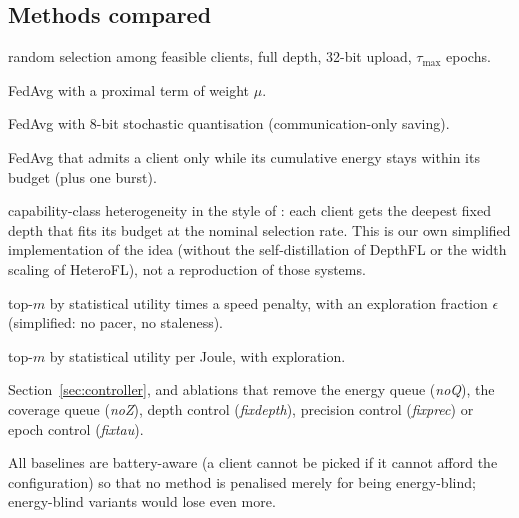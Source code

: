 \subsection{Methods compared}
\begin{description}[leftmargin=1.2em,labelindent=0pt,itemsep=1pt,topsep=2pt]
\item[FedAvg \citep{mcmahan2017communication}] random selection among feasible clients, full depth, 32-bit upload, $\tau_{\max}$ epochs.
\item[FedProx \citep{li2020fedprox}] FedAvg with a proximal term of weight $\mu$.
\item[FedAvg-Q8] FedAvg with 8-bit stochastic quantisation \citep{alistarh2017qsgd} (communication-only saving).
\item[FedAvg-Paced] FedAvg that admits a client only while its cumulative energy stays within its budget (plus one burst).
\item[Static-Depth] capability-class heterogeneity in the style of \citet{diao2021heterofl,kim2023depthfl,ilhan2023scalefl}: each client gets the deepest fixed depth that fits its budget at the nominal selection rate. This is our own simplified implementation of the idea (without the self-distillation of DepthFL or the width scaling of HeteroFL), not a reproduction of those systems.
\item[Oort-style \citep{lai2021oort}] top-$m$ by statistical utility times a speed penalty, with an exploration fraction $\epsilon$ (simplified: no pacer, no staleness).
\item[Energy-greedy] top-$m$ by statistical utility per Joule, with exploration.
\item[EcoFed] Section~\ref{sec:controller}, and ablations that remove the energy queue (\textit{noQ}), the coverage queue (\textit{noZ}), depth control (\textit{fixdepth}), precision control (\textit{fixprec}) or epoch control (\textit{fixtau}).
\end{description}
All baselines are battery-aware (a client cannot be picked if it cannot afford the configuration) so that no method is penalised merely for being energy-blind; energy-blind variants would lose even more.

